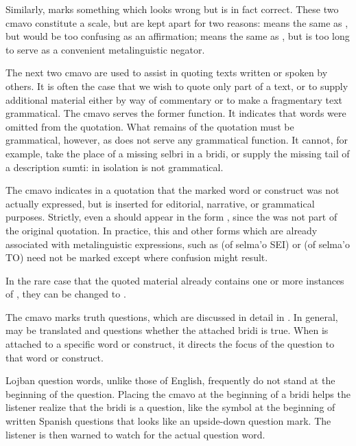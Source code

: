 Similarly,  marks something which looks wrong but is
    in fact correct. These two cmavo constitute a scale, but are
    kept apart for two reasons:  means the same as
    , but would be too confusing as an affirmation;
     means the same as , but is too long to
    serve as a convenient metalinguistic negator.

The next two cmavo are used to assist in quoting texts
    written or spoken by others. It is often the case that we wish
    to quote only part of a text, or to supply additional material
    either by way of commentary or to make a fragmentary text
    grammatical. The cmavo  serves the former function. It
    indicates that words were omitted from the quotation. What
    remains of the quotation must be grammatical, however, as
     does not serve any grammatical function. It cannot,
    for example, take the place of a missing selbri in a bridi, or
    supply the missing tail of a description sumti:  in
    isolation is not grammatical.

The cmavo  indicates in a quotation that the marked
    word or construct was not actually expressed, but is inserted
    for editorial, narrative, or grammatical purposes. Strictly,
    even a  should appear in the form , since
    the  was not part of the original quotation. In
    practice, this and other forms which are already associated
    with metalinguistic expressions, such as  (of selma'o
    SEI) or  (of selma'o TO) need not be marked except
    where confusion might result.

In the rare case that the quoted material already contains
    one or more instances of , they can be changed to
    .

The cmavo  marks truth questions, which are discussed
    in detail in . In general,
     may be translated  and
    questions whether the attached bridi is true. When  is
    attached to a specific word or construct, it directs the focus
    of the question to that word or construct.

Lojban question words, unlike those of English, frequently
    do not stand at the beginning of the question. Placing the
    cmavo  at the beginning of a bridi helps the listener
    realize that the bridi is a question, like the symbol at the
    beginning of written Spanish questions that looks like an
    upside-down question mark. The listener is then warned to watch
    for the actual question word.

